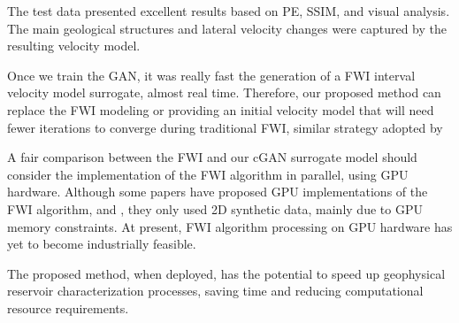 \documentclass[conference]{IEEEtran}
\begin{document}
The test data presented excellent results based on PE, SSIM, and visual analysis. The main geological structures and lateral velocity changes were captured by the resulting velocity model.


Once we train the GAN, it was really fast the generation of a FWI interval velocity model surrogate, almost real time. Therefore, our proposed method can replace the FWI modeling or providing an initial velocity model that will need fewer iterations to converge during traditional FWI, similar strategy adopted by\cite{senior2020improved}

A fair comparison between the FWI and our cGAN surrogate model should consider the implementation of the FWI algorithm in parallel, using GPU hardware. Although some papers have proposed GPU implementations of the FWI algorithm\cite{Wang2011CUDAbasedAO}, \cite{Mao2012MultiscaleFW} and \cite{Fang2020ElasticFI}, they only used 2D synthetic data, mainly due to GPU memory constraints. At present, FWI algorithm processing on GPU hardware has yet to become industrially feasible.

The proposed method, when deployed, has the potential to speed up geophysical reservoir characterization processes, saving time and reducing computational resource requirements.



\end{document}
